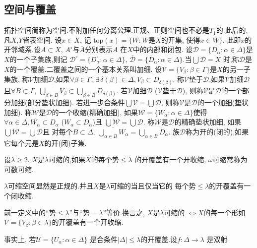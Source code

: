 \documentclass[main.tex]{subfiles}
\begin{document}
\subsection{空间与覆盖}\label{ch1.1.2}
拓扑空间简称为空间.不附加任何分离公理.正规、正则空间也不必是$T_1$的.此后的,凡$X$,$Y$皆表空间.
设$x\in X$, 记
$\textrm{top}(x) = \{W: W$是$X$的开集, 使得$ x\in W\}$.
此即$x$的开邻域系.设$A\subset X$, $A^\circ$与$\overline{A}$分别表示$A$ 在$X$中的内部和闭包.
设$\mathscr{D}=\{D_\alpha:\alpha\in\Delta\}$是$X$的一个子集族,则记
$\mathscr{D}^\circ=\{D^\circ_\alpha:\alpha\in\Delta\}$,
$\overline{\mathscr{D}}=\{\overline{D}_\alpha:\alpha\in\Delta\}$.当$\bigcup\mathscr{D} = X$
时,称$\mathscr{D}$是$X$的一个覆盖.二覆盖之间的一个基本关系叫加细.
设$\mathscr{V}=\{V_\beta:\beta\in\Gamma\}$是$X$的另一子集族,
称$\mathscr{V}$加细$\mathscr{D}$,如果$\forall\beta\in\Gamma$, 
$\exists\, \delta (\beta)\in\Delta, V_\beta\subset D_{\delta(\beta)}$.
称$\mathscr{V}$垫于$\mathscr{D}$,如果$\mathscr{V}$加细$\mathscr{D}$
且$\forall B\subset\Gamma$, 
$\overline{\bigcup_{\beta\in B}V_\beta}\subset \bigcup_{\beta\in B}D_{\delta(\beta)}$.
若$\mathscr{V}$加细$\mathscr{D}$
($\mathscr{V}$垫于$\mathscr{D}$),
则称$\mathscr{V}$是$\mathscr{D}$的一个部分加细(部分垫状加细).
若进一步合条件$\bigcup\mathscr{V}=\bigcup\mathscr{D}$,
则称$\mathscr{V}$是$\mathscr{D}$的一个加细(垫状加细).
称$\mathscr{W}$是$\mathscr{D}$的一个收缩(精确加细),
如果$\mathscr{W}=\{W_\alpha: \alpha\in\Delta\}$使得
$\forall\alpha\in \Delta, \overline{W_\alpha}\subset D_\alpha$
($W_\alpha\subset D_\alpha$)且
$\bigcup\mathscr{W}  = \bigcup \mathscr{D}$.
称$\mathscr{W}$是$\mathscr{D}$的精确垫状加细,
如果$\bigcup\mathscr{W}  = \bigcup \mathscr{D}$且
对每个$B\subset \Delta$, 
$\overline{\bigcup_{\alpha\in B}W_\alpha}  = \bigcup_{\alpha\in B}D_\alpha$.
族$\mathscr{D}$称为开的(闭的),如果它每个元是$X$的开(闭)子集.

\begin{definition}
设$\lambda \ge2$. $X$是$\lambda$可缩的,如果$X$的每个势$\le \lambda$
的开覆盖有一个开收缩, $\omega$可缩常称为可数可缩.
\end{definition}
$\lambda$可缩空间显然是正规的.并且$X$是$\lambda$可缩的当且仅当它的
每个势$\le \lambda$的开覆盖有一个闭收缩.

\begin{note}%
前一定义中的“势$\le \lambda$”与“势$= \lambda$”等价.换言之,
$X$是$\lambda$可缩的 $\Leftrightarrow X$的每一个形如
$\mathscr{V}=\{V_\beta: \beta\in\lambda\}$的开覆盖有一个开收缩. 

事实上, 若$\mathscr{U}=\{U_\alpha: \alpha\in\Delta\}$
是合条件$|\Delta|\le\lambda$的开覆盖.设$f: \Delta\to\lambda$
是双射
\end{note}
\end{document}
